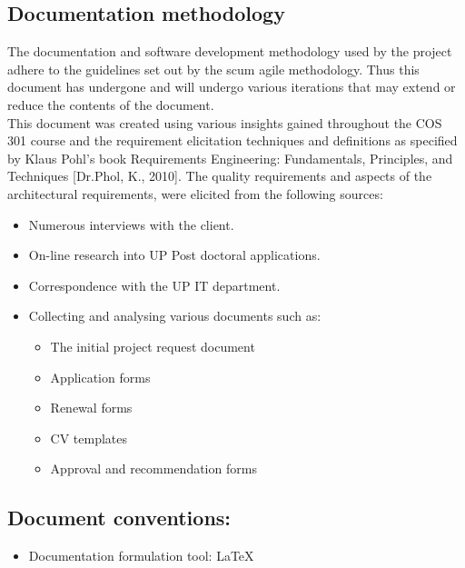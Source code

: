 \documentclass[12pt]{article}
\begin{document}
\subsection{Documentation methodology}
\vspace{0.2in}
\begin{flushleft}
The documentation and software development methodology used by the project adhere to the guidelines set out by the scum agile methodology. Thus this document has undergone and will undergo various iterations that may extend or reduce the contents of the document.\\

This document was created using various insights gained throughout the COS 301 course and the requirement elicitation techniques and definitions as specified by Klaus Pohl’s book Requirements Engineering: Fundamentals, Principles, and Techniques [Dr.Phol, K., 2010].
The quality requirements and aspects of the architectural requirements, were elicited from the following sources:
\begin{itemize}
	\item Numerous interviews with the client.
	\item On-line research into UP Post doctoral applications.
	\item Correspondence with the UP IT department.
	\item Collecting and analysing various documents such as:
		\begin{itemize}
			\item The initial project request document
			\item Application forms
			\item Renewal forms
			\item CV templates
			\item Approval and recommendation forms
		\end{itemize}
\end{itemize}
\end{flushleft}	

\vspace{0.5in}

\subsection{Document conventions:}
\vspace{0.1in}
\begin{itemize}
\item Documentation formulation tool: LaTeX
\end{itemize}
\end{document}
